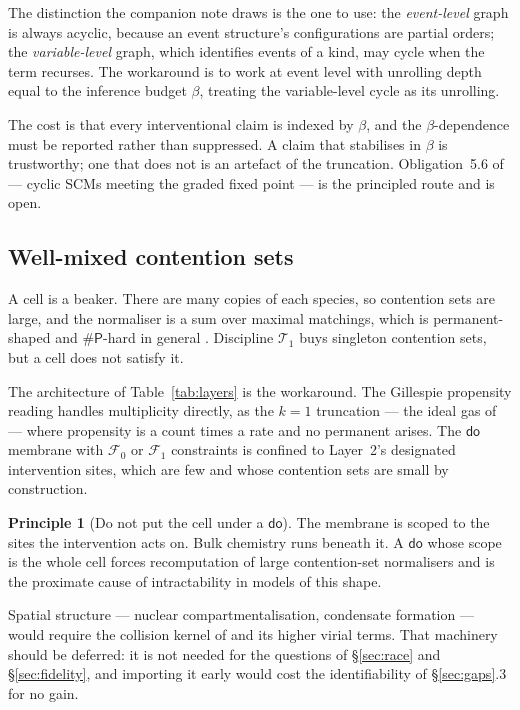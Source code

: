\documentclass[11pt,a4paper]{article}
\theoremstyle{plain}
\theoremstyle{definition}
\newtheorem{principle}[theorem]{Principle}
\theoremstyle{remark}
\newcommand{\dok}{\textsf{do}}
\begin{document}
The distinction the companion note draws is the one to use: the
\emph{event-level} graph is always acyclic, because an event structure's
configurations are partial orders; the \emph{variable-level} graph, which
identifies events of a kind, may cycle when the term recurses. The workaround
is to work at event level with unrolling depth equal to the inference budget
$\beta$, treating the variable-level cycle as its unrolling.

The cost is that every interventional claim is indexed by $\beta$, and the
$\beta$-dependence must be reported rather than suppressed. A claim that
stabilises in $\beta$ is trustworthy; one that does not is an artefact of the
truncation. Obligation~5.6 of \cite{Interventions} --- cyclic SCMs meeting the
graded fixed point \cite{BongersEtAl} --- is the principled route and is open.

\subsection{Well-mixed contention sets}

A cell is a beaker. There are many copies of each species, so contention sets
are large, and the normaliser is a sum over maximal matchings, which is
permanent-shaped and $\#\mathsf{P}$-hard in general
\cite[\S4.1]{Interventions}. Discipline $\mathcal{T}_1$ buys singleton
contention sets, but a cell does not satisfy it.

The architecture of Table~\ref{tab:layers} is the workaround. The Gillespie
propensity reading handles multiplicity directly, as the $k=1$ truncation ---
the ideal gas of \cite{ProcessMolecules} --- where propensity is a count times
a rate and no permanent arises. The $\dok$ membrane with $\mathcal{F}_0$ or
$\mathcal{F}_1$ constraints is confined to Layer~2's designated intervention
sites, which are few and whose contention sets are small by construction.

\begin{principle}[Do not put the cell under a $\dok$]\label{prin:nodok}
The membrane is scoped to the sites the intervention acts on. Bulk chemistry
runs beneath it. A $\dok$ whose scope is the whole cell forces recomputation
of large contention-set normalisers and is the proximate cause of
intractability in models of this shape.
\end{principle}

Spatial structure --- nuclear compartmentalisation, condensate formation ---
would require the collision kernel of \cite{ProcessMolecules} and its higher
virial terms. That machinery should be deferred: it is not needed for the
questions of \S\ref{sec:race} and \S\ref{sec:fidelity}, and importing it early
would cost the identifiability of \S\ref{sec:gaps}.3 for no gain.
\end{document}
